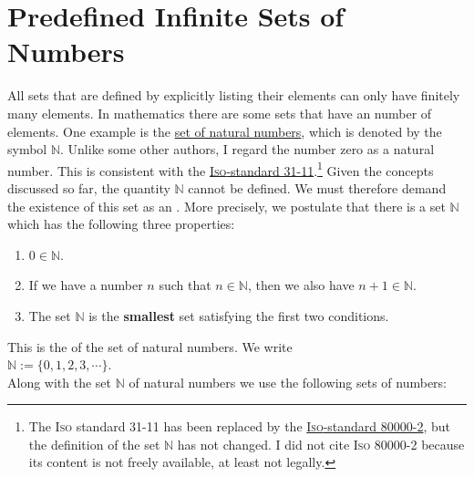 \section{Predefined Infinite Sets of Numbers}
All sets that are defined by explicitly listing their elements can only have finitely many elements.  
In mathematics there are some sets that have an  number of
elements.  One example is the 
\href{http://en.wikipedia.org/wiki/Natural_number}{set of natural numbers},  
which is denoted by the symbol $\mathbb{N}$.
Unlike some other authors, I regard the number zero as a natural number.  This is consistent with the
\href{https://en.wikipedia.org/wiki/ISO_31-11}{\textsc{Iso}-standard 31-11}.\footnote{
  The \textsc{Iso} standard 31-11 has been replaced by the
  \href{https://en.wikipedia.org/wiki/ISO_80000-2}{\textsc{Iso}-standard 80000-2},
  but the definition of the set $\mathbb{N}$ has not changed.  I did not cite \textsc{Iso} 80000-2 because 
  its content is not freely available, at least not legally.
}
Given the concepts discussed so far, the quantity $\mathbb{N}$ cannot be defined.
We must therefore demand the existence of this set as an .  More precisely, we postulate that there is a
set $\mathbb{N}$ which has the following three properties:
\begin{enumerate}
\item $0 \in \mathbb{N}$.
\item If we have a number $n$ such that $n \in \mathbb{N}$, then we also have $n+1 \in \mathbb{N}$.
\item The set $\mathbb{N}$ is the \textbf{smallest} set satisfying the first two conditions.
\end{enumerate}
This is the  of the set of natural numbers.
We write \\[0.2cm]
\hspace*{1.3cm} $\mathbb{N} := \{ 0, 1, 2, 3, \cdots \}$. \\[0.2cm]
Along with the set $\mathbb{N}$ of natural numbers we use the following sets of numbers: 
